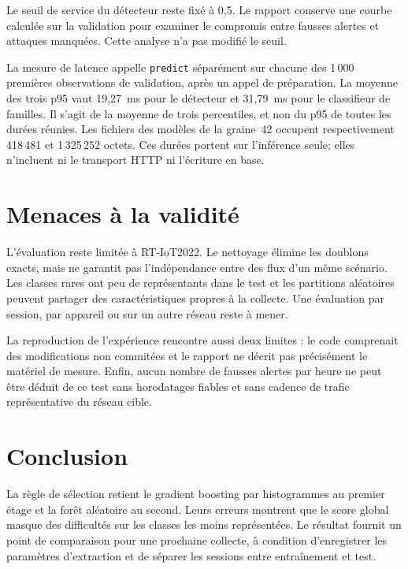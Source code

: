 Le seuil de service du détecteur reste fixé à 0,5. Le rapport conserve une
courbe calculée sur la validation pour examiner le compromis entre fausses
alertes et attaques manquées. Cette analyse n'a pas modifié le seuil.

La mesure de latence appelle \texttt{predict} séparément sur chacune des
1\,000 premières observations de validation, après un appel de préparation.
La moyenne des trois p95 vaut 19,27~ms pour le détecteur et 31,79~ms pour le
classifieur de familles. Il s'agit de la moyenne de trois percentiles, et non
du p95 de toutes les durées réunies. Les fichiers des modèles de la graine~42
occupent respectivement 418\,481 et 1\,325\,252 octets. Ces durées portent sur
l'inférence seule; elles n'incluent ni le transport HTTP ni l'écriture en base.

\section{Menaces \`a la validit\'e}

L'évaluation reste limitée à RT-IoT2022. Le nettoyage élimine les doublons
exacts, mais ne garantit pas l'indépendance entre des flux d'un même scénario.
Les classes rares ont peu de représentants dans le test et les partitions
aléatoires peuvent partager des caractéristiques propres à la collecte.
Une évaluation par session, par appareil ou sur un autre réseau reste à mener.

La reproduction de l'expérience rencontre aussi deux limites : le code
comprenait des modifications non commitées et le rapport ne décrit pas
précisément le matériel de mesure. Enfin, aucun nombre de fausses
alertes par heure ne peut être déduit de ce test sans horodatages fiables et
sans cadence de trafic représentative du réseau cible.

\section{Conclusion}

La règle de sélection retient le gradient boosting par histogrammes au premier
étage et la forêt aléatoire au second. Leurs erreurs montrent que le score
global masque des difficultés sur les classes les moins représentées.
Le résultat fournit un point de comparaison pour une prochaine collecte,
à condition d'enregistrer les paramètres d'extraction et de séparer les sessions
entre entraînement et test.

